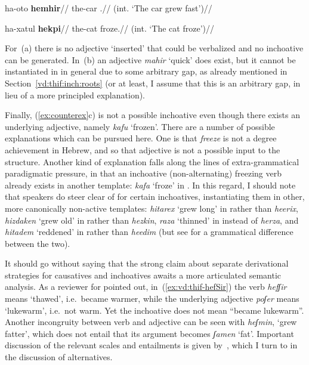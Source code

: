 	\a \ljudge{*}
		\begingl
		\gla ha-oto \textbf{hemhir}//
		\glb the-car .//
		\glft (int. `The car grew fast')//
	\endgl

	\a \ljudge{*}
		\begingl
		\gla ha-xatul \textbf{hekpi}//
		\glb the-cat froze.//
		\glft (int. `The cat froze')//
	\endgl
\xe

For~(\lastx a) there is no adjective `inserted' that could be verbalized and no inchoative can be generated. In~(\lastx b) an adjective \emph{mahir} `quick' does exist, but it cannot be instantiated in {\thif} in general due to some arbitrary gap, as already mentioned in Section~\ref{vd:thif:inch:roots} (or at least, I assume that this is an arbitrary gap, in lieu of a more principled explanation).

Finally, (\ref{ex:counterex}c) is not a possible inchoative even though there exists an underlying adjective, namely \emph{kafu} `frozen'. There are a number of possible explanations which can be pursued here. One is that \emph{freeze} is not a degree achievement in Hebrew, and so that adjective is not a possible input to the structure. Another kind of explanation falls along the lines of extra-grammatical paradigmatic pressure, in that an inchoative (non-alternating) freezing verb already exists in another template: \emph{kafa} `froze' in {\tkal}. In this regard, I should note that speakers do steer clear of {\thif} for certain inchoatives, instantiating them in other, more canonically non-active templates: \emph{hitarex} `grew long' in {\thit} rather than \emph{heerix}, \emph{hizdaken} `grew old' in {\thit} rather than \emph{hezkin}, \emph{raza} `thinned' in {\tkal} instead of \emph{herza}, and \emph{hitadem} `reddened' in {\thit} rather than \emph{heedim} (but see \citealt[22]{doron03} for a grammatical difference between the two).

It should go without saying that the strong claim about separate derivational strategies for causatives and inchoatives awaits a more articulated semantic analysis. As a reviewer for \cite{kastner19tlr} pointed out, in~(\ref{ex:vd:thif-hefSir}) the verb \emph{hefʃir} means `thawed', i.e.~became warmer, while the underlying adjective \emph{poʃer} means `lukewarm', i.e.~not warm. Yet the inchoative does not mean ``became lukewarm''. Another incongruity between verb and adjective can be seen with \emph{heʃmin}, `grew fatter', which does not entail that its argument becomes \emph{ʃamen} `fat'. Important discussion of the relevant scales and entailments is given by~\cite{borer91}, which I turn to in the discussion of alternatives.

